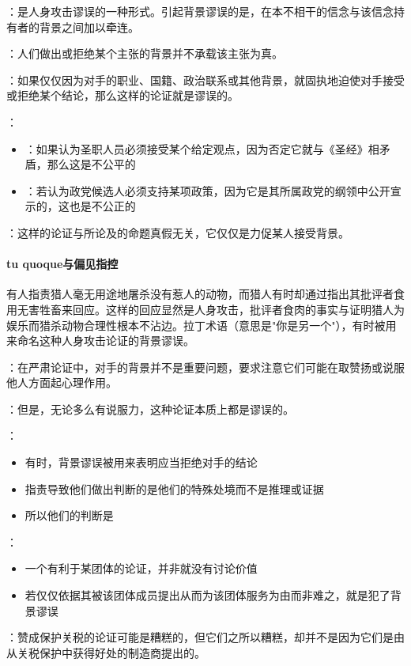 \begin{theorembox}[title=B. 背景谬误]
：是人身攻击谬误的一种形式。引起背景谬误的是，在本不相干的信念与该信念持有者的背景之间加以牵连。

：人们做出或拒绝某个主张的背景并不承载该主张为真。

：如果仅仅因为对手的职业、国籍、政治联系或其他背景，就固执地迫使对手接受或拒绝某个结论，那么这样的论证就是谬误的。

：
\begin{itemize}
  \item {}：如果认为圣职人员必须接受某个给定观点，因为否定它就与《圣经》相矛盾，那么这是不公平的
  \item {}：若认为政党候选人必须支持某项政策，因为它是其所属政党的纲领中公开宣示的，这也是不公正的
\end{itemize}

：这样的论证与所论及的命题真假无关，它仅仅是力促某人接受背景。
\end{theorembox}

\paragraph{tu quoque与偏见指控}
\begin{examplebox}[title=tu quoque谬误示例]
有人指责猎人毫无用途地屠杀没有惹人的动物，而猎人有时却通过指出其批评者食用无害牲畜来回应。这样的回应显然是人身攻击，批评者食肉的事实与证明猎人为娱乐而猎杀动物合理性根本不沾边。拉丁术语（意思是"你是另一个"），有时被用来命名这种人身攻击论证的背景谬误。
\end{examplebox}

\begin{theorembox}[title=背景谬误的心理机制与偏见指控]
：在严肃论证中，对手的背景并不是重要问题，要求注意它们可能在取赞扬或说服他人方面起心理作用。

：但是，无论多么有说服力，这种论证本质上都是谬误的。

：
\begin{itemize}
  \item 有时，背景谬误被用来表明应当拒绝对手的结论
  \item 指责导致他们做出判断的是他们的特殊处境而不是推理或证据
  \item 所以他们的判断是
\end{itemize}

：
\begin{itemize}
  \item 一个有利于某团体的论证，并非就没有讨论价值
  \item 若仅仅依据其被该团体成员提出从而为该团体服务为由而非难之，就是犯了背景谬误
\end{itemize}

：赞成保护关税的论证可能是糟糕的，但它们之所以糟糕，却并不是因为它们是由从关税保护中获得好处的制造商提出的。
\end{theorembox}

